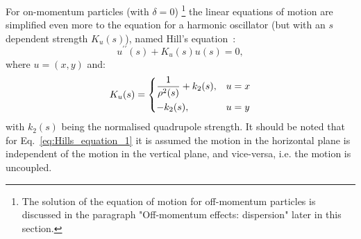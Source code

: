 For on-momentum particles (with $\delta=0$) \footnote{The solution of the equation of motion for off-momentum particles is discussed in the paragraph "Off-momentum effects: dispersion" later in this section.} the linear equations of motion are simplified even more to the equation for a harmonic oscillator (but with an $s$ dependent strength $K_u(s)$), named Hill's equation~\cite{Lee:1425444}:
\begin{equation}\label{eq:Hills_equation_1}
    u^{\prime \prime}(s) + K_u(s) u(s) = 0,
\end{equation}
where $u=(x,y)$ and:
 \begin{equation}\label{eq:Hills_equation_2}
    K_u(s) = \begin{dcases}
        \frac{1}{\rho^2(s)}+k_2(s), & u=x \\
        -k_2(s), & u=y 
    \end{dcases}
\end{equation}
with $k_2(s)$ being the normalised quadrupole strength. It should be noted that for Eq.~\eqref{eq:Hills_equation_1} it is assumed the motion in the horizontal plane is independent of the motion in the vertical plane, and vice-versa, i.e. the motion is uncoupled. %



